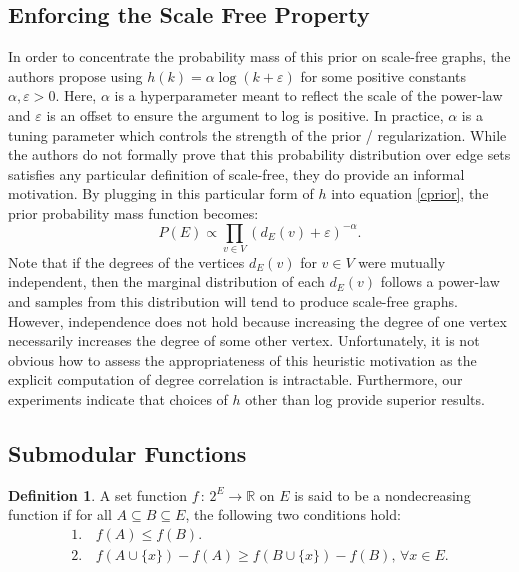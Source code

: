 \documentclass{uwstat572}
\theoremstyle{remark}
\theoremstyle{definition}
\newtheorem{definition}{Definition}[section]
\begin{document}
\subsection{Enforcing the Scale Free Property}

In order to concentrate the probability mass of this prior on scale-free graphs, the authors propose using $h(k) = \alpha \log(k + \varepsilon)$ for some positive constants $\alpha, \varepsilon > 0$.  Here, $\alpha$ is a  hyperparameter meant to reflect the scale of the power-law and $\varepsilon$ is an offset to ensure the argument to log is positive. In practice, $\alpha$ is a tuning parameter which controls the strength of the prior / regularization. While the authors do not formally prove that this probability distribution over edge sets satisfies any particular definition of scale-free, they do provide an informal motivation.  By plugging in this particular form of $h$ into equation \eqref{cprior}, the prior probability mass function becomes:
\begin{equation*}
    P( E) \propto \prod_{v \in V} (d_E(v) + \varepsilon)^{-\alpha}.
\end{equation*}
Note that if the degrees of the vertices $d_E(v)$ for $v \in V$ were mutually independent, then the marginal distribution of each $d_E(v)$ follows a power-law and samples from this distribution will tend to produce scale-free graphs.  However, independence does not hold because increasing the degree of one vertex necessarily increases the degree of some other vertex.  Unfortunately, it is not obvious how to assess the appropriateness of this heuristic motivation as the explicit computation of degree correlation is intractable.  Furthermore, our experiments indicate that choices of $h$ other than log provide superior results.

\subsection{Submodular Functions}

\theoremstyle{definition}
\begin{definition}
A set function $f \, : \, 2^E \to \mathbb{R}$ on $E$ is said to be a nondecreasing  function if for all $A \subseteq B \subseteq E$, the following two conditions hold:
\begin{equation*}
\begin{aligned}
1. \,& f(A) \leq f(B).
\\
2. \, & f(A \cup \{x\}) - f(A) \geq f(B \cup \{x\}) - f(B), \, \forall x \in E.
\end{aligned}
\end{equation*}
\end{definition}
\end{document}
